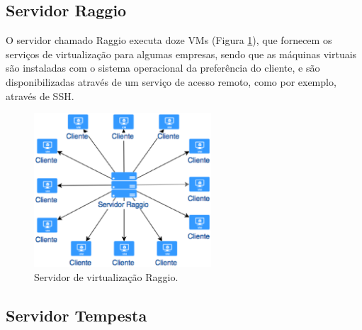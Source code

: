 \subsection{Servidor Raggio}
\label{section:serv_raggio}

O servidor chamado Raggio executa doze \ac{VM}s (Figura \ref{fig:servidor_raggio}), que fornecem os serviços de virtualização para algumas empresas,
sendo que as máquinas virtuais são instaladas com o sistema operacional da preferência do cliente, e são disponibilizadas através de um serviço 
de acesso remoto, como por exemplo, através de \ac{SSH}.

\begin{figure}[h!]
 \centering
 \includegraphics[width=250px]{img/servidor_raggio.eps}
 \caption{Servidor de virtualização Raggio.}
 \label{fig:servidor_raggio}
\end{figure}

\subsection{Servidor Tempesta}
\label{section:serv_tempesta}

